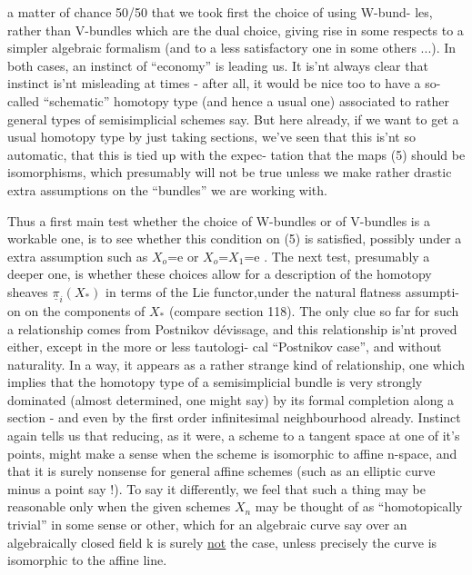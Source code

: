 
a matter of chance 50/50  that we took first the choice of using W-bund-%
les,  rather than V\xout{(}-bundles which are the dual choice,  giving rise in
some respects to a simpler algebraic formalism (and to a 
less satisfactory one in some others ...).  In both cases,  an instinct
of ``economy'' is leading us.  It is'nt always clear that instinct is'nt
misleading at times - after all,  it would be nice too to have a so-%
called ``schematic'' homotopy type (and hence a usual one) associated to
rather general types of semisimplicial schemes say.  But here already,
if we want to get a usual homotopy type by just taking sections,  we've
seen that this is'nt so automatic,  that this is tied up with the expec-%
tation that the maps (5) should be isomorphisms,  which presumably will
not be true unless we make rather drastic extra assumptions on the
``bundles'' we are working with.

Thus a first main test whether the choice of W-bundles or of
V-bundles is a workable one,  is to see whether this condition on (5)
is satisfied,  possibly under a  extra assumption  such as $X_{o}$=e  or
$X_{o}$=$X_{1}$=e .  The next test,  presumably a deeper one,  is whether these
choices allow for a description of the homotopy sheaves $\underline{\pi}_{i}(X_{*})$  in
terms of the Lie functor,under  the natural flatness assumpti-%
on on the components of $X_{*}$  (compare  section 118).  The only clue so
far for such a relationship comes from Postnikov dévissage,  and this
relationship is'nt proved either, except in the more or less tautologi-%
cal ``Postnikov case'',  and without naturality.  In a way,  it appears
as a rather strange kind of relationship,  one which implies that the
homotopy type of a semisimplicial bundle is very strongly dominated
(almost determined, one might say) by 
 its formal completion along a
section  -  and even by the first order infinitesimal neighbourhood
already.  Instinct again tells us that reducing,  as it were,  a
scheme to a tangent space at one of it's points,  might make a sense
when the scheme is isomorphic to affine n-space,  and that it is surely
nonsense for general affine schemes (such as an elliptic curve minus a
point\xout{,} say !).  To say it differently,  we feel that such a thing may
be reasonable\xout{,} only when the given schemes $X_{n}$ may be thought of as
``homotopically trivial'' in some sense or other,   which for an
algebraic curve say over an algebraically closed field k is surely \uline{not}
the case,  unless precisely the curve is isomorphic to the affine line.

